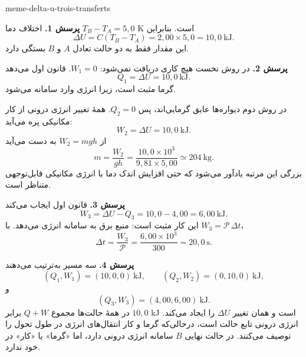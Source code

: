 \begin{exo}{meme-delta-u-trois-transferts}
\begin{solution}
\textbf{پرسش 1.} اختلاف دما $T_B-T_A=5{,}0$ K است. بنابراین
\[
\Delta U=C(T_B-T_A)
=2{,}00\times5{,}0
=10{,}0\ \mathrm{kJ}.
\]
این مقدار فقط به دو حالت تعادل $A$ و $B$ بستگی دارد.

\textbf{پرسش 2.} در روش نخست هیچ کاری دریافت نمی‌شود: $W_1=0$. قانون اول می‌دهد
\[
Q_1=\Delta U=10{,}0\ \mathrm{kJ}.
\]
گرما مثبت است، زیرا انرژی وارد سامانه می‌شود.

در روش دوم دیواره‌ها عایق گرمایی‌اند، پس $Q_2=0$. همهٔ تغییر انرژی درونی از
کار مکانیکی پره می‌آید:
\[
W_2=\Delta U=10{,}0\ \mathrm{kJ}.
\]
از $W_2=mgh$ به دست می‌آید
\[
m=\frac{W_2}{gh}
=\frac{10{,}0\times10^3}{9{,}81\times5{,}00}
\simeq 204\ \mathrm{kg}.
\]
بزرگی این مرتبه یادآور می‌شود که حتی افزایش اندک دما با انرژی مکانیکی
قابل‌توجهی متناظر است.

\textbf{پرسش 3.} قانون اول ایجاب می‌کند
\[
W_3=\Delta U-Q_3=10{,}0-4{,}00=6{,}00\ \mathrm{kJ}.
\]
این کار مثبت است: منبع برق به سامانه انرژی می‌دهد. با $W_3=\mathcal P\,\Delta t$،
\[
\Delta t=\frac{W_3}{\mathcal P}
=\frac{6{,}00\times10^3}{300}
=20{,}0\ \mathrm{s}.
\]

\textbf{پرسش 4.} سه مسیر به‌ترتیب می‌دهند
\[
(Q_1,W_1)=(10{,}0,0)\ \mathrm{kJ},
\qquad
(Q_2,W_2)=(0,10{,}0)\ \mathrm{kJ},
\]
و
\[
(Q_3,W_3)=(4{,}00,6{,}00)\ \mathrm{kJ}.
\]
در همهٔ حالت‌ها مجموع $Q+W$ برابر $10{,}0$ kJ است و همان تغییر $\Delta U$
را ایجاد می‌کند. انرژی درونی تابع حالت است، درحالی‌که گرما و کار انتقال‌های
انرژی در طول تحول را توصیف می‌کنند. در حالت نهایی $B$ سامانه انرژی درونی
دارد، اما «گرما» یا «کار» در خود ندارد.
\end{solution}
\end{exo}


